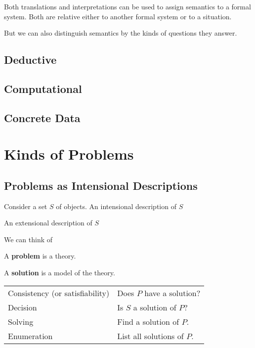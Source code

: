 Both translations and interpretations can be used to assign semantics to a formal system.
Both are relative either to another formal system or to a situation.

But we can also distinguish semantics by the kinds of questions they answer.

\subsection{Deductive}

\subsection{Computational}

\subsection{Concrete Data}

\section{Kinds of Problems}

\subsection{Problems as Intensional Descriptions}

\begin{remark}
Consider a set $S$ of objects.
An intensional description of $S$

An extensional description of $S$
\end{remark}

\begin{remark}
We can think of 
\end{remark}

\begin{definition}
A \textbf{problem} is a theory.

A \textbf{solution} is a model of the theory.
\end{definition}

\begin{center}
\begin{tabular}{ll}
Consistency (or satisfiability) & Does $P$ have a solution?\\
Decision & Is $S$ a solution of $P$? \\
Solving & Find a solution of $P$.\\
Enumeration & List all solutions of $P$.\\
\end{tabular}
\end{center}

